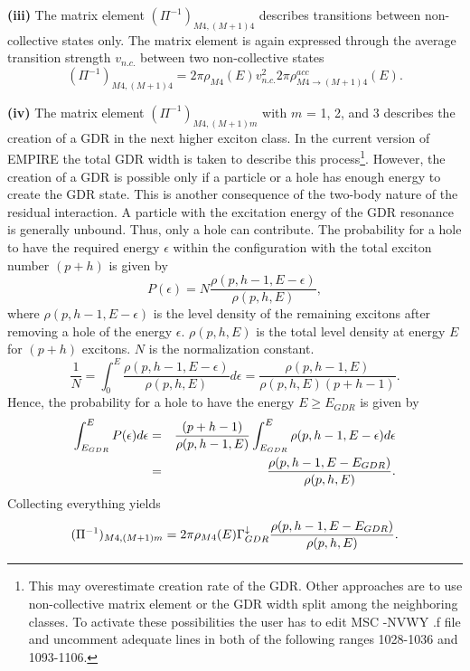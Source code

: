 \smallskip \textbf{(iii)} The matrix element $(\Pi^{-1})_{M4,(M+1)4}$
describes transitions between non-collective states only. The matrix element
is again expressed through the average transition strength $v_{n.c.}$
between two non-collective states 
\begin{equation}
(\Pi^{-1})_{M4,(M+1)4}=2\pi\rho_{M4}(E)v_{n.c.}^{2}2\pi\rho_{M4%
\rightarrow(M+1)4}^{acc}(E).
\end{equation}

\smallskip \textbf{(iv)} The matrix element $(\Pi^{-1})_{M4,(M+1)m}$ with $m$
= 1, 2, and 3 describes the creation of a GDR in the next higher exciton
class. In the current version of EMPIRE the total GDR width is taken to
describe this process\footnote{%
This may overestimate creation rate of the GDR. Other approaches are to use
non-collective matrix element or the GDR width split among the neighboring
classes. To activate these possibilities the user has to edit MSC%
-NVWY%
.f file and uncomment adequate lines in both of the following
ranges 1028-1036 and 1093-1106.}. However, the creation of a GDR is possible
only if a particle or a hole has enough energy to create the GDR state. This
is another consequence of the two-body nature of the residual interaction. A
particle with the excitation energy of the GDR resonance is generally
unbound. Thus, only a hole can contribute. The probability for a hole to
have the required energy $\epsilon$ within the configuration with the total
exciton number $(p+h)$ is given by 
\begin{equation}
P(\epsilon)=N%
\frac{\rho(p,h-1,E-\epsilon)}{\rho(p,h,E)},
\end{equation}
where $\rho(p,h-1,E-\epsilon)$ is the level density%
 of the remaining excitons after removing a hole
of the energy $\epsilon$. $\rho(p,h,E)$ is the total level density at energy 
$E$ for $(p+h)$ excitons. $N$ is the normalization constant. 
\begin{equation}
\frac{1}{N}=\int_{0}^{E}\frac{\rho(p,h-1,E-\epsilon)}{\rho(p,h,E)}d\epsilon=%
\frac{\rho(p,h-1,E)}{\rho(p,h,E)(p+h-1)}.
\end{equation}
Hence, the probability for a hole to have the energy $E\geq E_{GDR}$ is
given by 
\begin{eqnarray}
\int_{E_{GDR}}^{E}P(\epsilon)d\epsilon & = & \frac{(p+h-1)}{\rho(p,h-1,E)}%
\int_{E_{GDR}}^{E}\rho(p,h-1,E-\epsilon)d\epsilon  \notag \\
& = & \frac{\rho(p,h-1,E-E_{GDR})}{\rho(p,h,E)}.
\end{eqnarray}
Collecting everything yields 
\begin{equation}
(\Pi^{-1})_{M4,(M+1)m}=2\pi\rho_{M4}(E)\Gamma_{GDR}^{\downarrow}\frac{%
\rho(p,h-1,E-E_{GDR})}{\rho(p,h,E)}.
\end{equation}

